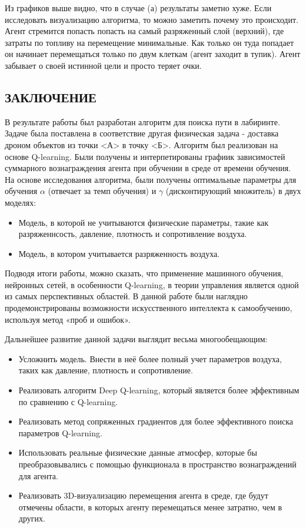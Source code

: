 \documentclass[a4paper]{report}
\theoremstyle{definition}
\theoremstyle{plain}
\theoremstyle{remark}
\theoremstyle{remark}
\theoremstyle{definition}
\begin{document}
Из графиков выше видно, что в случае (а) результаты заметно хуже. Если исследовать визуализацию алгоритма, то можно заметить почему это происходит. Агент стремится попасть попасть на самый разряженный слой (верхний), где затраты по топливу на перемещение минимальные. Как только он туда попадает он начинает перемещаться только по двум клеткам (агент заходит в тупик). Агент забывает о своей истинной цели и просто теряет очки.

\newpage
\begin{center}
    \section*{ЗАКЛЮЧЕНИЕ}
\end{center}

В результате работы был разработан алгоритм для поиска пути в лабиринте. Задаче была поставлена в соответствие другая физическая задача - доставка дроном объектов из точки <А> в точку <Б>. Алгоритм был реализован на основе Q-learning. Были получены и интерпетированы графиик зависимостей суммарного вознаграждения агента при обучении в среде от времени обучения. На основе исследования алгоритма, были получены оптимальные параметры для обучения $\alpha$ (отвечает за темп обучения) и $\gamma$ (дисконтирующий множитель) в двух моделях:
\begin{itemize}
    \item Модель, в которой не учитываются физические параметры, такие как разряженнсость, давление, плотность и сопротивление воздуха.
    \item Модель, в котором учитывается разряженность воздуха.
\end{itemize}

Подводя итоги работы, можно сказать, что применение машинного обучения, нейронных сетей, в особенности Q-learning, в теории управления является одной из самых перспективных областей. В данной работе были наглядно продемонстрированы возможности искусственного интеллекта к самообучению, используя метод «проб и ошибок».

Дальнейшее развитие данной задачи выглядит весьма многообещающим:
\begin{itemize}
    \item Усложнить модель. Внести в неё более полный учет параметров воздуха, таких как давление, плотность и сопротивление.
    \item Реализовать алгоритм Deep Q-learning, который является более эффективным по сравнению с Q-learning.
    \item Реализовать метод сопряженных градиентов для более эффективного поиска параметров Q-learning.
    \item Использовать реальные физические данные атмосфер, которые бы преобразовывались с помощью функционала в пространство вознаграждений для агента.
     \item Реализовать 3D-визуализацию перемещения агента в среде, где будут отмечены области, в которых агенту перемещаться менее затратно, чем в других.
\end{itemize}
\end{document}
